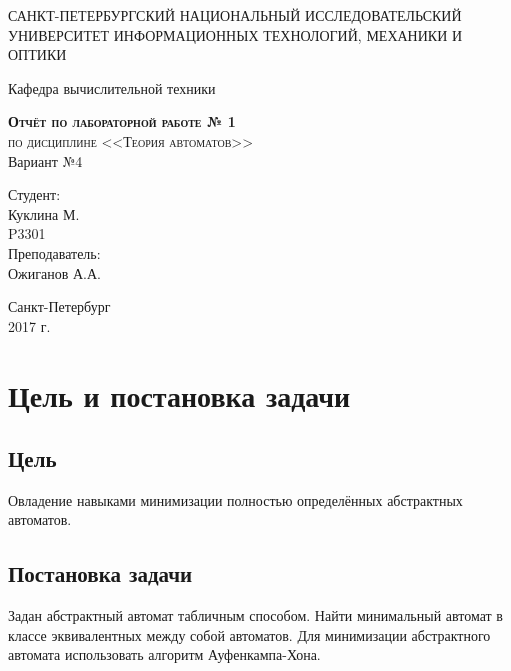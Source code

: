 \documentclass[a4paper,10pt]{article}
\begin{document}
    \begin{titlepage}
        \begin{center}
            \large
            САНКТ-ПЕТЕРБУРГСКИЙ НАЦИОНАЛЬНЫЙ ИССЛЕДОВАТЕЛЬСКИЙ УНИВЕРСИТЕТ ИНФОРМАЦИОННЫХ ТЕХНОЛОГИЙ, МЕХАНИКИ И ОПТИКИ \\


            \vspace{3cm}


            Кафедра вычислительной техники
            \vspace{4cm}

            \textsc{ \textbf{Отчёт по лабораторной работе  № 1} \\
            по дисциплине <<Теория автоматов>>\\}
            Вариант №4\\[8mm]

            \bigskip
        \end{center}
        \vspace{3cm}

        \hfill\begin{flushright}
             Студент: \\ Куклина М. \\ P3301 \\ 
             \vfill
             Преподаватель:\\ Ожиганов А.А.
        \end{flushright}
        \vfill
        \vfill
        \vfill
        \vfill
        \vfill
        \begin{center}
            Санкт-Петербург \\2017 г.
        \end{center}
    \end{titlepage}
\newpage

\section*{Цель и постановка задачи}
    \subsection*{Цель}
		Овладение навыками минимизации полностью определённых абстрактных автоматов.
    \subsection*{Постановка задачи}
		Задан абстрактный автомат табличным способом.
		Найти минимальный автомат в классе эквивалентных между собой автоматов.
		Для минимизации абстрактного автомата использовать алгоритм Ауфенкампа-Хона. 
\end{document}

